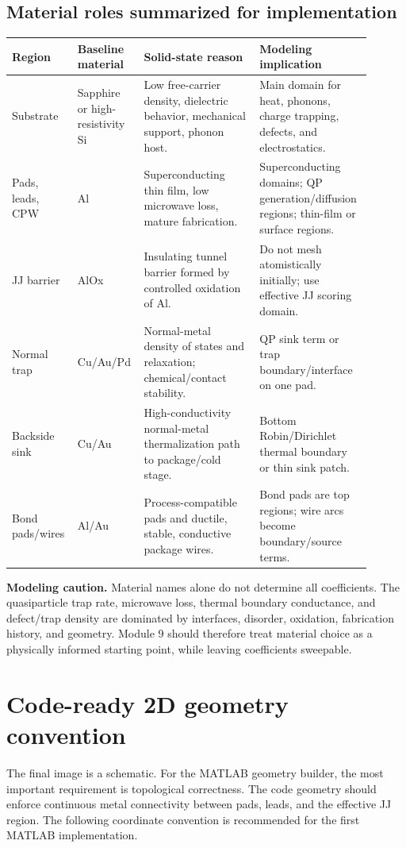 \documentclass[11pt]{article}
\begin{document}
\subsection{Material roles summarized for implementation}
\begin{longtable}{>{\RaggedRight\arraybackslash}p{0.15\linewidth} >{\RaggedRight\arraybackslash}p{0.15\linewidth} >{\RaggedRight\arraybackslash}p{0.31\linewidth} >{\RaggedRight\arraybackslash}p{0.29\linewidth}}
\toprule
\textbf{Region} & \textbf{Baseline material} & \textbf{Solid-state reason} & \textbf{Modeling implication}\\
\midrule
Substrate & Sapphire or high-resistivity Si & Low free-carrier density, dielectric behavior, mechanical support, phonon host. & Main domain for heat, phonons, charge trapping, defects, and electrostatics.\\
Pads, leads, CPW & Al & Superconducting thin film, low microwave loss, mature fabrication. & Superconducting domains; QP generation/diffusion regions; thin-film or surface regions.\\
JJ barrier & AlOx & Insulating tunnel barrier formed by controlled oxidation of Al. & Do not mesh atomistically initially; use effective JJ scoring domain.\\
Normal trap & Cu/Au/Pd & Normal-metal density of states and relaxation; chemical/contact stability. & QP sink term or trap boundary/interface on one pad.\\
Backside sink & Cu/Au & High-conductivity normal-metal thermalization path to package/cold stage. & Bottom Robin/Dirichlet thermal boundary or thin sink patch.\\
Bond pads/wires & Al/Au & Process-compatible pads and ductile, stable, conductive package wires. & Bond pads are top regions; wire arcs become boundary/source terms.\\
\bottomrule
\end{longtable}

\begin{notebox}
\textbf{Modeling caution.} Material names alone do not determine all coefficients. The quasiparticle trap rate, microwave loss, thermal boundary conductance, and defect/trap density are dominated by interfaces, disorder, oxidation, fabrication history, and geometry. Module 9 should therefore treat material choice as a physically informed starting point, while leaving coefficients sweepable.
\end{notebox}

\section{Code-ready 2D geometry convention}
The final image is a schematic. For the MATLAB geometry builder, the most important requirement is topological correctness. The code geometry should enforce continuous metal connectivity between pads, leads, and the effective JJ region. The following coordinate convention is recommended for the first MATLAB implementation.
\end{document}
